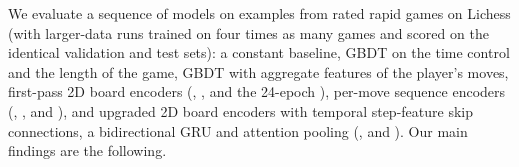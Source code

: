 \documentclass[11pt]{article}
\begin{document}
We evaluate a sequence of models on  examples from
 rated rapid games on Lichess (with larger-data runs trained on
four times as many games and scored on the identical validation and test sets):
a constant baseline, GBDT on the time control and the length of the game, GBDT
with  aggregate features of the player's moves, first-pass
2D board encoders (, ,
 and the 24-epoch ), per-move
sequence encoders (, ,  and
), and upgraded 2D board encoders with temporal
step-feature skip connections, a bidirectional GRU and attention pooling
(,  and
). Our main findings are the following.
\end{document}
